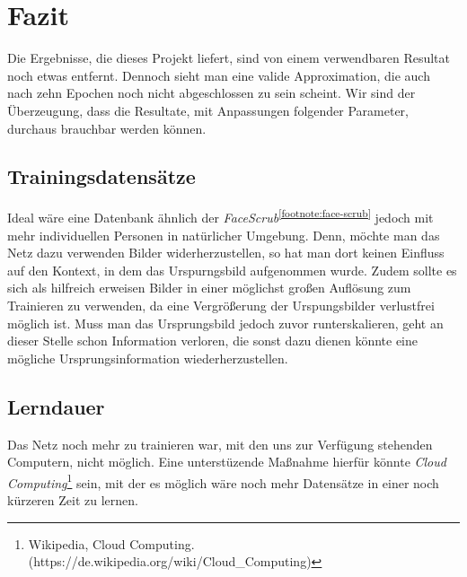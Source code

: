 \section{Fazit}

Die Ergebnisse, die dieses Projekt liefert, sind von einem verwendbaren Resultat noch etwas entfernt. Dennoch sieht man eine
valide Approximation, die auch nach zehn Epochen noch nicht abgeschlossen zu sein scheint. Wir sind der Überzeugung, dass die Resultate,
mit Anpassungen folgender Parameter, durchaus brauchbar werden können.

\subsection{Trainingsdatensätze}
Ideal wäre eine Datenbank ähnlich der \textit{FaceScrub}\textsuperscript{\ref{footnote:face-scrub}} jedoch mit mehr
individuellen Personen in natürlicher Umgebung. Denn, möchte man das Netz dazu verwenden Bilder widerherzustellen, so
hat man dort keinen Einfluss auf den Kontext, in dem das Urspurngsbild aufgenommen wurde.
Zudem sollte es sich als hilfreich erweisen Bilder in einer möglichst großen Auflösung zum Trainieren zu verwenden, da
eine Vergrößerung der Urspungsbilder verlustfrei möglich ist. Muss man das Ursprungsbild jedoch zuvor runterskalieren, geht
an dieser Stelle schon Information verloren, die sonst dazu dienen könnte eine mögliche Ursprungsinformation wiederherzustellen.

\subsection{Lerndauer}
Das Netz noch mehr zu trainieren war, mit den uns zur Verfügung stehenden Computern, nicht möglich. Eine unterstüzende Maßnahme
hierfür könnte \textit{Cloud Computing}\footnote{Wikipedia, Cloud Computing.\newline(https://de.wikipedia.org/wiki/Cloud\_Computing)}
sein, mit der es möglich wäre noch mehr Datensätze in einer noch kürzeren Zeit zu lernen.
